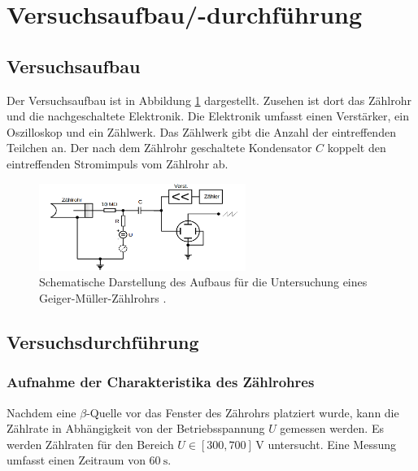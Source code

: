 \section{Versuchsaufbau/-durchführung}

\subsection{Versuchsaufbau}
Der Versuchsaufbau ist in Abbildung \ref{fig: versuchsaufabu} dargestellt.
Zusehen ist dort das Zählrohr und die nachgeschaltete Elektronik.
Die Elektronik umfasst einen Verstärker, ein Oszilloskop und
ein Zählwerk. Das Zählwerk gibt die Anzahl der eintreffenden Teilchen
an. Der nach dem Zählrohr geschaltete Kondensator $C$ koppelt den eintreffenden
Stromimpuls vom Zählrohr ab.
\begin{figure}
  \centering
  \includegraphics[width=0.6\textwidth]{bilder/aufbau.png}
  \caption{Schematische Darstellung des Aufbaus für die Untersuchung eines Geiger-Müller-Zählrohrs \cite{anleitung703}.}
  \label{fig: versuchsaufabu}
  \end{figure}
\subsection{Versuchsdurchführung}

\subsubsection{Aufnahme der Charakteristika des Zählrohres}

Nachdem eine $\beta$-Quelle vor das Fenster des Zährohrs platziert wurde,
kann die Zählrate in Abhängigkeit von der Betriebsspannung $U$ gemessen werden.
Es werden Zählraten für den Bereich $U\in\left[300, 700\right] \, \si{\volt}$
untersucht. Eine Messung umfasst einen Zeitraum von $\SI{60}{\second}$.


